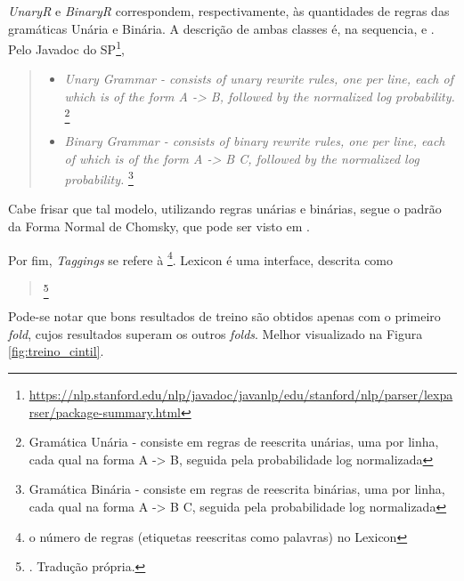 \textit{UnaryR} e \textit{BinaryR} correspondem, respectivamente, às quantidades de regras das gramáticas Unária e Binária. A descrição de ambas classes é, na sequencia,  e . Pelo Javadoc do SP\footnote{\url{https://nlp.stanford.edu/nlp/javadoc/javanlp/edu/stanford/nlp/parser/lexparser/package-summary.html}},
\begin{quote}
    \begin{itemize}
        \item \textit{Unary Grammar - consists of unary rewrite rules, one per line, each of which is of the form A -> B, followed by the normalized log probability.}
        \footnote{Gramática Unária - consiste em regras de reescrita unárias, uma por linha, cada qual na forma A -> B, seguida pela probabilidade log normalizada}
        \item \textit{Binary Grammar - consists of binary rewrite rules, one per line, each of which is of the form A -> B C, followed by the normalized log probability.}
        \footnote{Gramática Binária - consiste em regras de reescrita binárias, uma por linha, cada qual na forma A -> B C, seguida pela probabilidade log normalizada}
    \end{itemize}
\end{quote}
Cabe frisar que tal modelo, utilizando regras unárias e binárias, segue o padrão da Forma Normal de Chomsky, que pode ser visto em .

Por fim, \textit{Taggings} se refere à \footnote{o número de regras (etiquetas reescritas como palavras) no Lexicon}. Lexicon é uma interface, descrita como
\begin{quote}
    \footnote{. Tradução própria.}
\end{quote}
Pode-se notar que bons resultados de treino são obtidos apenas com o primeiro \textit{fold}, cujos resultados superam os outros \textit{folds}. Melhor visualizado na Figura \ref{fig:treino_cintil}.
\begin{center}
    
\end{center}

